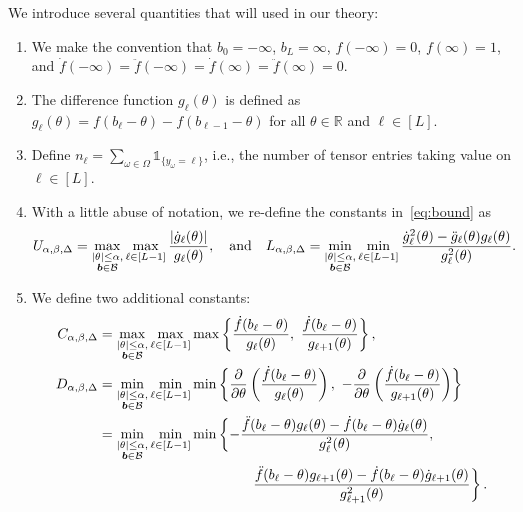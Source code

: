 \documentclass[11pt]{article}
\theoremstyle{plain}
\theoremstyle{definition}
\providecommand{\DIFaddtex}[1]{{\protect\color{blue}\uwave{#1}}} %
\providecommand{\DIFaddbegin}{} %
\providecommand{\DIFaddend}{} %
\providecommand{\DIFadd}[1]{\texorpdfstring{\DIFaddtex{#1}}{#1}} %
\begin{document}
We introduce several quantities that will \DIFaddbegin \DIFadd{be }\DIFaddend used in our theory:
 \begin{enumerate} 
\item We make the convention that $b_0=-\infty$, $b_L=\infty$, $f(-\infty)=0$, $f(\infty)=1$, and $\dot{f}(-\infty)=\ddot{f}(-\infty)=\dot{f}(\infty)=\ddot{f}(\infty)=0$.

\item The difference function $g_\ell(\theta)$ is defined as $g_\ell(\theta)=f(b_\ell-\theta)-f(b_{\ell-1}-\theta)$ for all $\theta\in\mathbb{R}$ and $\ell\in[L]$.

\item Define $n_\ell=\sum_{\omega\in\Omega}\mathds{1}_{\{y_\omega=\ell\}}$, i.e., the number of tensor entries taking value on $\ell\in[L]$.

\item With a little abuse of notation, we re-define the constants in~\eqref{eq:bound} as
\begin{equation}\label{eq:UL}
U_{\alpha,\beta,\Delta}=\max_{ \substack{|\theta|\leq \alpha,\\ \bm{b} \in\mathcal{B}}}\max_{\ell\in[L-1]}{|\dot{g}_\ell(\theta)|\over g_\ell(\theta)}, \quad \text{and}\quad
L_{\alpha,\beta,\Delta}=\min_{ \substack{|\theta|\leq \alpha,\\ \bm{b} \in\mathcal{B}}}\min_{\ell\in[L-1]} {\dot{g}^2_\ell(\theta)-\ddot{g}_\ell(\theta)g_\ell(\theta)\over g^2_\ell(\theta)}.
\end{equation}
\item We define two additional constants:
\begin{align}\label{eq:CD}
C_{\alpha,\beta,\Delta} &= \max_{ \substack{|\theta|\leq \alpha,\\ \mb \in\tB}}  \max_{\ell\in[L-1]}\max\left\{\frac{\dot{f}(b_\ell-\theta)}{g_\ell(\theta)},\ \frac{\dot{f}(b_\ell-\theta)}{g_{\ell+1}(\theta)}\right\},\notag \\
D_{\alpha,\beta,\Delta} &=\min_{ \substack{|\theta|\leq \alpha,\\ \mb \in\tB}} \min_{\ell\in[L-1]}\min\left\{  {\partial \over \partial \theta}\left({\dot{f}(b_{\ell}-\theta)\over g_\ell(\theta)}\right),\ -{\partial \over \partial \theta}\left({\dot{f}(b_{\ell}-\theta)\over g_{\ell+1}(\theta)}\right)\right\}\notag \\
&=  \min_{ \substack{|\theta|\leq \alpha,\\ \mb \in\tB}}\min_{\ell\in[L-1]}\min \left\{-\frac{\ddot{f}(b_\ell-\theta)g_\ell(\theta)-\dot{f}(b_\ell-\theta)\dot{g}_\ell(\theta)}{g^2_\ell(\theta)},\ \right. \notag \\
&\hspace{1.5in} \left. \frac{\ddot{f}(b_\ell-\theta)g_{\ell+1}(\theta)-\dot{f}(b_\ell-\theta)\dot{g}_{\ell+1}(\theta)}{g^2_{\ell+1}(\theta)}\right\}.
\end{align}
 \end{enumerate} 
\end{document}
